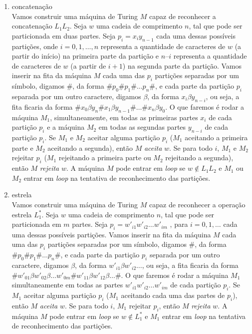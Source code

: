 \begin{enumerate}[label={\textbf{\alph*.}}]
    \item concatenação\\[3pt]
    Vamos construir uma máquina de Turing $M$ capaz de reconhecer a concatenação $L_1L_2$.
    Seja $w$ uma cadeia de comprimento $n$, tal que pode ser particionada em duas partes. Seja $p_i = x_iy_{n-1}$ cada uma dessas possíveis partições, onde $i = 0, 1, \ldots, n$ representa a quantidade de caracteres de $w$ (a partir do início) na primeira parte da partição e $n – i$ representa a quantidade de caracteres de $w$ (a partir de $i + 1$) na segunda parte da partição. Vamos inserir na fita da máquina $M$ cada uma das $p_i$ partições separadas por um símbolo, digamos $\texttt{\#}$, da forma $\texttt{\#}p_0\texttt{\#}p_1\texttt{\#}\ldots p_n\texttt{\#}$, e cada parte da partição $p_i$ separada por um outro caractere, digamos $\beta$, da forma $x_i\beta y_{n-i}$, ou seja, a fita ficaria da forma $\texttt{\#}x_0\beta y_n\texttt{\#}x_1\beta y_{n-1}\texttt{\#}\ldots \texttt{\#}x_n\beta y_0$. O que faremos é rodar a máquina $M_1$, simultaneamente, em todas as primeiras partes $x_i$ de cada partição $p_i$ e a máquina $M_2$ em todas as segundas partes $y_{n-i}$ de cada partição $p_i$. Se $M_1$ e $M_2$ aceitar alguma partição $p_i$ ($M_1$ aceitando a primeira parte e $M_2$ aceitando a segunda), então $M$ \textit{aceita} $w$. Se para todo $i$, $M_1$ e $M_2$ rejeitar $p_i$ ($M_1$ rejeitando a primeira parte ou $M_2$ rejeitando a segunda), então $M$ \textit{rejeita} $w$. A máquina $M$ pode entrar em \textit{loop} se $w \notin L_1L_2$ e $M_1$ ou $M_2$ entrar em \textit{loop} na tentativa de reconhecimento das partições.
    
    \item estrela\\[3pt]
    Vamos construir uma máquina de Turing $M$ capaz de reconhecer a operação estrela $L_1^*$.
    Seja $w$ uma cadeia de comprimento $n$, tal que pode ser particionada em $m$ partes. Seja $p_i = w'_{i1}w'_{i2} \ldots w'_{im}$ , para $i = 0, 1, \ldots$ cada uma dessas possíveis partições. Vamos inserir na fita da máquina $M$ cada uma das $p_i$ partições separadas por um símbolo, digamos $\texttt{\#}$, da forma $\texttt{\#}p_0\texttt{\#}p_1\texttt{\#} \ldots p_n\texttt{\#}$, e cada parte da partição $p_i$ separada por um outro caractere, digamos $\beta$, da forma $w'_{i1}\beta w'_{i2} \ldots$, ou seja, a fita ficaria da forma $\texttt{\#}w'_{01}\beta w'_{02}\beta \ldots w'_{0m}\texttt{\#}w'_{11}\beta w'_{12}\beta \ldots \texttt{\#}$. O que faremos é rodar a máquina $M_1$ simultaneamente em todas as partes $w'_{i1}w'_{i2}\ldots w'_{im}$ de cada partição $p_i$. Se $M_1$ aceitar alguma partição $p_i$ ($M_1$ aceitando cada uma das partes de $p_i$), então $M$ \textit{aceita} $w$. Se para todo $i$, $M_1$ rejeitar $p_i$, então $M$ \textit{rejeita} $w$. A máquina $M$ pode entrar em \textit{loop} se $w \notin L_1^*$ e $M_1$ entrar em \textit{loop} na tentativa de reconhecimento das partições.
    

\end{enumerate}
